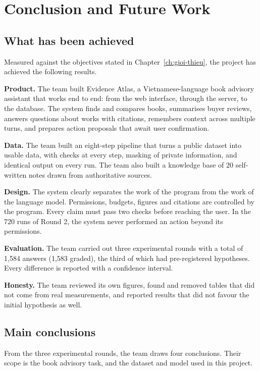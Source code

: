 \chapter{Conclusion and Future Work}
\label{ch:ket-luan}

\section{What has been achieved}

Measured against the objectives stated in Chapter~\ref{ch:gioi-thieu}, the project has achieved the following results.

\textbf{Product.} The team built Evidence Atlas, a Vietnamese-language book advisory assistant that works end to end: from the web interface, through the server, to the database. The system finds and compares books, summarises buyer reviews, answers questions about works with citations, remembers context across multiple turns, and prepares action proposals that await user confirmation.

\textbf{Data.} The team built an eight-step pipeline that turns a public dataset into usable data, with checks at every step, masking of private information, and identical output on every run. The team also built a knowledge base of 20 self-written notes drawn from authoritative sources.

\textbf{Design.} The system clearly separates the work of the program from the work of the language model. Permissions, budgets, figures and citations are controlled by the program. Every claim must pass two checks before reaching the user. In the 720 runs of Round 2, the system never performed an action beyond its permissions.

\textbf{Evaluation.} The team carried out three experimental rounds with a total of 1,584 answers (1,583 graded), the third of which had pre-registered hypotheses. Every difference is reported with a confidence interval.

\textbf{Honesty.} The team reviewed its own figures, found and removed tables that did not come from real measurements, and reported results that did not favour the initial hypothesis as well.

\section{Main conclusions}

From the three experimental rounds, the team draws four conclusions. Their scope is the book advisory task, and the dataset and model used in this project.

